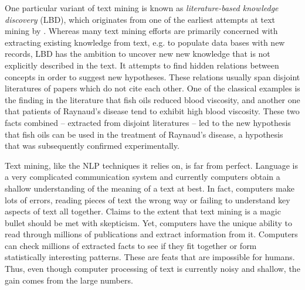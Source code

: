 One particular variant of text mining is known as\emph{ literature-based knowledge discovery} (LBD), which originates from one of the earliest attempts at text mining by \citet{swa86a}.
Whereas many text mining efforts are primarily concerned with extracting existing knowledge from text, e.g. to populate data bases with new records, LBD has the ambition to uncover new new knowledge that is not explicitly described in the text.
It attempts to find hidden relations between concepts in order to suggest new hypotheses.
These relations usually span disjoint literatures of papers which do not cite each other. 
One of the classical examples is the finding in the literature that fish oils reduced blood viscosity, and another one that patients of Raynaud's disease tend to exhibit high blood viscosity. 
These two facts combined -- extracted from disjoint literatures -- led to the new hypothesis that fish oils can be used in the treatment of Raynaud's disease, a hypothesis that was subsequently confirmed experimentally.

Text mining, like the NLP techniques it relies on, is far from perfect.
Language is a very complicated communication system and currently computers obtain a shallow understanding of the meaning of a text at best.
In fact, computers make lots of errors, reading pieces of text the wrong way or failing to understand key aspects of text all together.
Claims to the extent that text mining is a magic bullet should be met with skepticism. 
Yet, computers have the unique ability to read through millions of publications and extract information from it.
Computers can check millions of extracted facts to see if they fit together or form statistically interesting patterns.
These are feats that are impossible for humans.
Thus, even though computer processing of text is currently noisy and shallow, the gain comes from the large numbers.

